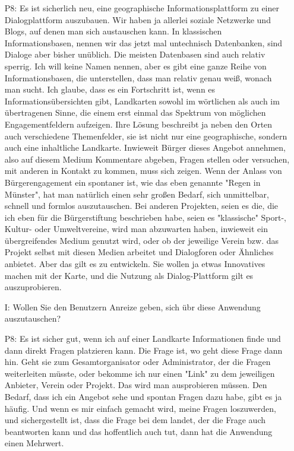 \begin{itemize}
    \item[P8:] Es ist sicherlich neu, eine geographische Informationsplattform zu einer Dialogplattform auszubauen. Wir haben ja allerlei soziale Netzwerke und Blogs, auf denen man sich austauschen kann. In klassischen Informationsbasen, nennen wir das jetzt mal untechnisch Datenbanken, sind Dialoge aber bisher un{\"u}blich. Die meisten Datenbasen sind auch relativ sperrig. Ich will keine Namen nennen, aber es gibt eine ganze Reihe von Informationsbasen, die unterstellen, dass man relativ genau wei{\ss}, wonach man sucht. Ich glaube, dass es ein Fortschritt ist, wenn es Informations{\"u}bersichten gibt, Landkarten sowohl im w{\"o}rtlichen als auch im {\"u}bertragenen Sinne, die einem erst einmal das Spektrum von m{\"o}glichen Engagementfeldern aufzeigen. Ihre L{\"o}sung beschreibt ja neben den Orten auch verschiedene Themenfelder, sie ist nicht nur eine geographische, sondern auch eine inhaltliche Landkarte. Inwieweit B{\"u}rger dieses Angebot annehmen, also auf diesem Medium Kommentare abgeben, Fragen stellen oder versuchen, mit anderen in Kontakt zu kommen, muss sich zeigen. Wenn der Anlass von B{\"u}rgerengagement ein spontaner ist, wie das eben genannte "Regen in M{\"u}nster", hat man nat{\"u}rlich einen sehr gro{\ss}en Bedarf, sich unmittelbar, schnell und formlos auszutauschen. Bei anderen Projekten, seien es die, die ich eben f{\"u}r die B{\"u}rgerstiftung beschrieben habe, seien es "klassische" Sport-, Kultur- oder Umweltvereine, wird man abzuwarten haben, inwieweit ein {\"u}bergreifendes Medium genutzt wird, oder ob der jeweilige Verein bzw. das Projekt selbst mit diesen Medien arbeitet und Dialogforen oder {\"A}hnliches anbietet. Aber das gilt es zu entwickeln. Sie wollen ja etwas Innovatives machen mit der Karte, und die Nutzung als Dialog-Plattform gilt es auszuprobieren.
    \item[I:] Wollen Sie den Benutzern Anreize geben, sich {\"u}br diese Anwendung auszutauschen?
    \item[P8:] Es ist sicher gut, wenn ich auf einer Landkarte Informationen finde und dann direkt Fragen platzieren kann. Die Frage ist, wo geht diese Frage dann hin. Geht sie zum Gesamtorganisator oder Administrator, der die Fragen weiterleiten m{\"u}sste, oder bekomme ich nur einen "Link" zu dem jeweiligen Anbieter, Verein oder Projekt. Das wird man ausprobieren m{\"u}ssen. Den Bedarf, dass ich ein Angebot sehe und spontan Fragen dazu habe, gibt es ja h{\"a}ufig. Und wenn es mir einfach gemacht wird, meine Fragen loszuwerden, und sichergestellt ist, dass die Frage bei dem landet, der die Frage auch beantworten kann und das hoffentlich auch tut, dann hat die Anwendung einen Mehrwert.

\end{itemize}
